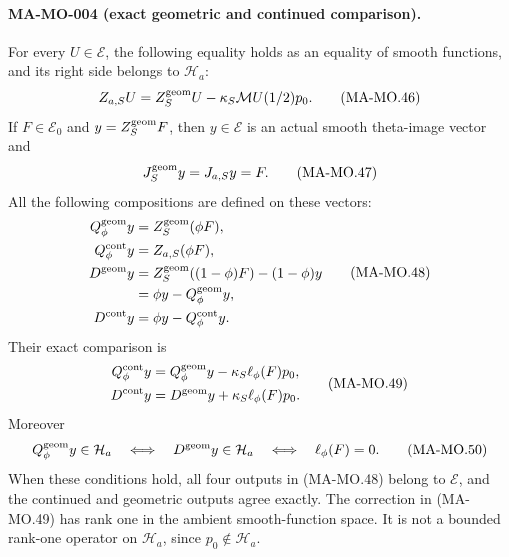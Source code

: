 \paragraph{MA-MO-004 (exact geometric and continued comparison).}
For every \(U\in\mathcal E\), the following equality holds as an
equality of smooth functions, and its right side belongs to
\(\mathcal H_a\):
\[
 Z_{a,S}U=Z_S^{\rm geom}U-\kappa_S\mathcal MU(1/2)p_0.
 \tag{MA-MO.46}
\]
If \(F\in\mathcal E_0\) and \(y=Z_S^{\rm geom}F\), then \(y\in
\mathcal E\) is an actual smooth theta-image vector and
\[
                       J_S^{\rm geom}y=J_{a,S}y=F.
 \tag{MA-MO.47}
\]
All the following compositions are defined on these vectors:
\[
 \begin{aligned}
 Q_\phi^{\rm geom}y&=Z_S^{\rm geom}(\phi F),\\
 Q_\phi^{\rm cont}y&=Z_{a,S}(\phi F),\\
 D^{\rm geom}y&=Z_S^{\rm geom}((1-\phi)F)-(1-\phi)y\\
              &=\phi y-Q_\phi^{\rm geom}y,\\
 D^{\rm cont}y&=\phi y-Q_\phi^{\rm cont}y.
 \end{aligned}
 \tag{MA-MO.48}
\]
Their exact comparison is
\[
 \begin{aligned}
 Q_\phi^{\rm cont}y
       &=Q_\phi^{\rm geom}y-\kappa_S\ell_\phi(F)p_0,\\
 D^{\rm cont}y
       &=D^{\rm geom}y+\kappa_S\ell_\phi(F)p_0.
 \end{aligned}
 \tag{MA-MO.49}
\]
Moreover
\[
 Q_\phi^{\rm geom}y\in\mathcal H_a
 \quad\Longleftrightarrow\quad
 D^{\rm geom}y\in\mathcal H_a
 \quad\Longleftrightarrow\quad \ell_\phi(F)=0.
 \tag{MA-MO.50}
\]
When these conditions hold, all four outputs in (MA-MO.48) belong
to \(\mathcal E\), and the continued and geometric outputs agree
exactly. The correction in (MA-MO.49) has rank one in the ambient
smooth-function space. It is not a bounded rank-one operator on
\(\mathcal H_a\), since \(p_0\notin\mathcal H_a\).

